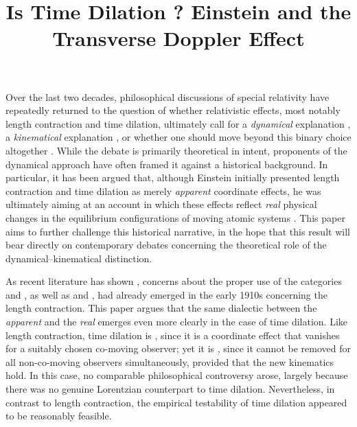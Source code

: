 \documentclass[submitted,12pt]{article}
\begin{document}
\title{Is Time Dilation ? Einstein and the Transverse Doppler Effect}
\maketitle

Over the last two decades, philosophical discussions of special relativity have repeatedly returned to the question of whether relativistic effects, most notably length contraction and time dilation, ultimately call for a \emph{dynamical} explanation , a \emph{kinematical} explanation , or whether one should move beyond this binary choice altogether \citep{Acuna2016}. While the debate is primarily theoretical in intent, proponents of the dynamical approach have often framed it against a historical background. In particular, it has been argued that, although Einstein initially presented length contraction and time dilation as merely \emph{apparent} coordinate effects, he was ultimately aiming at an account in which these effects reflect \emph{real} physical changes in the equilibrium configurations of moving atomic systems \citep{Brown2022}.  This paper aims to further challenge this historical narrative, in the hope that this result will bear directly on contemporary debates concerning the theoretical role of the dynamical–kinematical distinction. 

As recent literature has shown \citep{Giovanelli2023a}, concerns about the proper use of the categories  and , as well as  and , had already emerged in the early 1910s concerning the length contraction. This paper argues that the same dialectic between the \emph{apparent} and the \emph{real} emerges even more clearly in the case of time dilation. Like length contraction, time dilation is , since it is a coordinate effect that vanishes for a suitably chosen co-moving observer; yet it is , since it cannot be removed for all non-co-moving observers simultaneously, provided that the new kinematics hold. In this case, no comparable philosophical controversy arose, largely because there was no genuine Lorentzian counterpart to time dilation. Nevertheless, in contrast to length contraction, the empirical testability of time dilation appeared to be reasonably feasible. 
\end{document}
